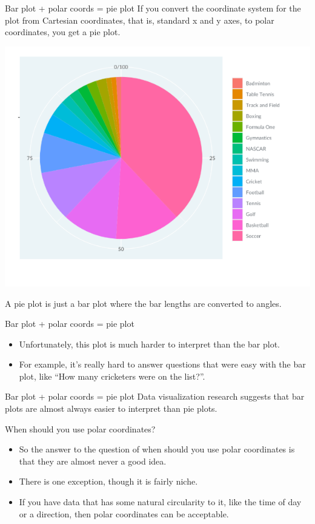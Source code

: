 \documentclass[
  ignorenonframetext,
]{beamer}
\begin{document}
\begin{frame}{Bar plot + polar coords = pie plot}
\label{bar-plot-polar-coords-pie-plot}
If you convert the coordinate system for the plot from Cartesian
coordinates, that is, standard x and y axes, to polar coordinates, you
get a pie plot.

\includegraphics{../images/im103.png}

A pie plot is just a bar plot where the bar lengths are converted to
angles.
\end{frame}

\begin{frame}{Bar plot + polar coords = pie plot}
\label{bar-plot-polar-coords-pie-plot-1}
\begin{itemize}
\item
  Unfortunately, this plot is much harder to interpret than the bar
  plot.
\item
  For example, it's really hard to answer questions that were easy with
  the bar plot, like ``How many cricketers were on the list?''.
\end{itemize}
\end{frame}

\begin{frame}{Bar plot + polar coords = pie plot}
\label{bar-plot-polar-coords-pie-plot-2}
Data visualization research suggests that bar plots are almost always
easier to interpret than pie plots.
\end{frame}

\begin{frame}{When should you use polar coordinates?}
\label{when-should-you-use-polar-coordinates}
\begin{itemize}
\item
  So the answer to the question of when should you use polar coordinates
  is that they are almost never a good idea.
\item
  There is one exception, though it is fairly niche.
\item
  If you have data that has some natural circularity to it, like the
  time of day or a direction, then polar coordinates can be acceptable.
\end{itemize}
\end{frame}
\end{document}

